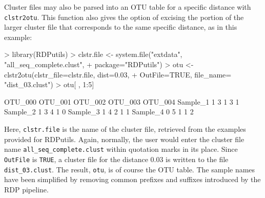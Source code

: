\documentclass{article}
\begin{document}
Cluster files may also be parsed into an OTU table for a specific distance with \texttt{clstr2otu}.  This function also gives the option of excising the portion of the larger cluster file that corresponds to the same specific distance, as in this example: 
\begin{Schunk}
\begin{Sinput}
> library(RDPutils)
> clstr.file <- system.file("extdata", "all_seq_complete.clust", 
+                           package="RDPutils")
> otu <- clstr2otu(clstr_file=clstr.file, dist=0.03, 
+                  OutFile=TRUE, file_name= "dist_03.clust")
> otu[ , 1:5] 
\end{Sinput}
\begin{Soutput}
         OTU_000 OTU_001 OTU_002 OTU_003 OTU_004
Sample_1       1       3       1       3       1
Sample_2       1       3       4       1       0
Sample_3       1       4       2       1       1
Sample_4       0       5       1       1       2
\end{Soutput}
\end{Schunk}
Here, \texttt{clstr.file} is the name of the cluster file, retrieved from the examples provided for RDPutils.  Again, normally, the user would enter the cluster file name \texttt{all\_seq\_complete.clust} within quotation marks in its place.  Since \texttt{OutFile} is \texttt{TRUE}, a cluster file for the distance 0.03 is written to the file \texttt{dist\_03.clust}.  The result, \texttt{otu}, is of course the OTU table.  The sample names have been simplified by removing common prefixes and suffixes introduced by the RDP pipeline.
\end{document}
